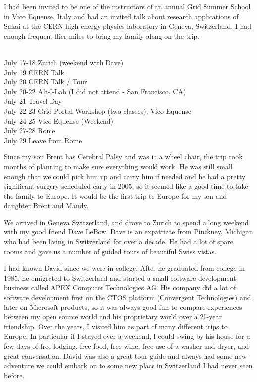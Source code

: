 \documentclass[12pt]{book}
\begin{document}
I had been invited to be one of the instructors of
an annual Grid Summer School in Vico Equense, Italy
and had an invited talk about research applications
of Sakai at the CERN high-energy physics laboratory
in Geneva, Switzerland.  I had enough frequent
flier miles to bring my family along on the trip.\\
\\
\begin{sf}
July 17-18 Zurich (weekend with Dave)\\
July 19 CERN Talk\\
July 20 CERN Talk / Tour\\
July 20-22 Alt-I-Lab (I did not attend - San Francisco, CA)\\
July 21 Travel Day\\
July 22-23 Grid Portal Workshop (two classes), Vico Equense\\
July 24-25 Vico Equense (Weekend)\\
July 27-28 Rome\\
July 29 Leave from Rome\\
\end{sf}

Since my son Brent has Cerebral Palsy and was in a wheel
chair, the trip took months of planning to make
sure everything would work.  He was still small enough that
we could pick him up and carry him if needed and he had
a pretty significant surgery scheduled early in 2005,
so it seemed like a good time to take the family to
Europe.  It would be the first trip to Europe for my son and daughter Brent
and Mandy.

We arrived in Geneva Switzerland, and drove to Zurich
to spend a long weekend with my good friend Dave LeBow.
Dave is an expatriate from Pinckney, Michigan who had been living
in Switzerland for over a decade.  He had a lot of spare
rooms and gave us a number of guided tours of
beautiful Swiss vistas.

I had known David since we were in college.   After he
graduated from college in 1985, he emigrated to
Switzerland and started a small software development business
called APEX Computer Technologies AG.
His company did a lot of software development
first on the CTOS platform (Convergent Technologies) and later on
Microsoft products, so it was always good fun to compare experiences between
my open source world and his proprietary world over a 20-year friendship.
Over the years, I visited him as part of many different trips to Europe.
In particular if I stayed over a weekend, I could swing by his house for
a few days of free lodging, free food, free wine, free use of a
washer and dryer, and great conversation.   David was also a great
tour guide and always had some new adventure we could embark on to
some new place in Switzerland I had never seen before.
\end{document}
